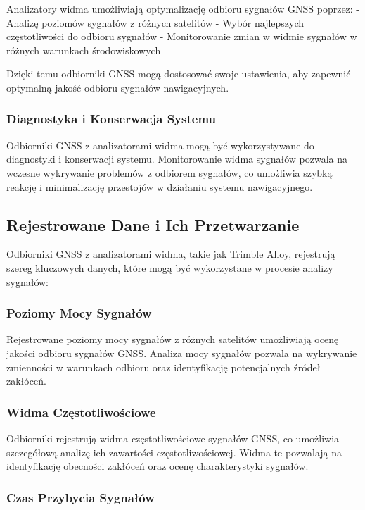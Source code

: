 Analizatory widma umożliwiają optymalizację odbioru sygnałów GNSS poprzez:
- Analizę poziomów sygnałów z różnych satelitów
- Wybór najlepszych częstotliwości do odbioru sygnałów
- Monitorowanie zmian w widmie sygnałów w różnych warunkach środowiskowych

Dzięki temu odbiorniki GNSS mogą dostosować swoje ustawienia, aby zapewnić optymalną jakość odbioru sygnałów nawigacyjnych.

\subsubsection{Diagnostyka i Konserwacja Systemu}

Odbiorniki GNSS z analizatorami widma mogą być wykorzystywane do diagnostyki i konserwacji systemu. Monitorowanie widma sygnałów pozwala na wczesne wykrywanie problemów z odbiorem sygnałów, co umożliwia szybką reakcję i minimalizację przestojów w działaniu systemu nawigacyjnego.

\subsection{Rejestrowane Dane i Ich Przetwarzanie}

Odbiorniki GNSS z analizatorami widma, takie jak Trimble Alloy, rejestrują szereg kluczowych danych, które mogą być wykorzystane w procesie analizy sygnałów:

\subsubsection{Poziomy Mocy Sygnałów}

Rejestrowane poziomy mocy sygnałów z różnych satelitów umożliwiają ocenę jakości odbioru sygnałów GNSS. Analiza mocy sygnałów pozwala na wykrywanie zmienności w warunkach odbioru oraz identyfikację potencjalnych źródeł zakłóceń.

\subsubsection{Widma Częstotliwościowe}

Odbiorniki rejestrują widma częstotliwościowe sygnałów GNSS, co umożliwia szczegółową analizę ich zawartości częstotliwościowej. Widma te pozwalają na identyfikację obecności zakłóceń oraz ocenę charakterystyki sygnałów.

\subsubsection{Czas Przybycia Sygnałów}

